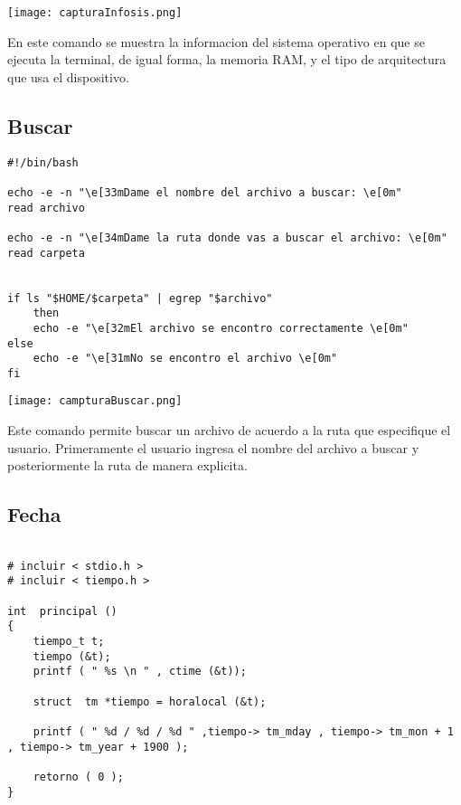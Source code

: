 \documentclass{article}
\begin{document}
\begin{center}
    \texttt{[image: capturaInfosis.png]}
\end{center}

\vspace{1cm}
\fontsize{12}{6}\selectfont
\textbf{}

En este comando se muestra la informacion del sistema operativo en que se ejecuta la terminal, de igual forma, la memoria RAM, y el tipo de arquitectura que usa el dispositivo.
\newpage


\subsection{Buscar}
\fontsize{10}{10}\selectfont
\begin{verbatim}
#!/bin/bash

echo -e -n "\e[33mDame el nombre del archivo a buscar: \e[0m"
read archivo

echo -e -n "\e[34mDame la ruta donde vas a buscar el archivo: \e[0m"
read carpeta


if ls "$HOME/$carpeta" | egrep "$archivo"
	then 
	echo -e "\e[32mEl archivo se encontro correctamente \e[0m"
else
	echo -e "\e[31mNo se encontro el archivo \e[0m"
fi
\end{verbatim}
\vspace{1.5cm}

\texttt{[image: campturaBuscar.png]}

\vspace{1.5cm}
\fontsize{12}{6}\selectfont
\textbf{}
Este comando permite buscar un archivo de acuerdo a la ruta que especifique el usuario. Primeramente el usuario ingresa el nombre del archivo a buscar y posteriormente la ruta de manera explicita.


\newpage
\subsection{Fecha}
\fontsize{9}{4.5}
\begin{verbatim}

# incluir < stdio.h >
# incluir < tiempo.h >

int  principal ()
{
	tiempo_t t;
	tiempo (&t);
	printf ( " %s \n " , ctime (&t));

	struct  tm *tiempo = horalocal (&t);

	printf ( " %d / %d / %d " ,tiempo-> tm_mday , tiempo-> tm_mon + 1 , tiempo-> tm_year + 1900 );
 
	retorno ( 0 );
}

\end{verbatim}
\end{document}
